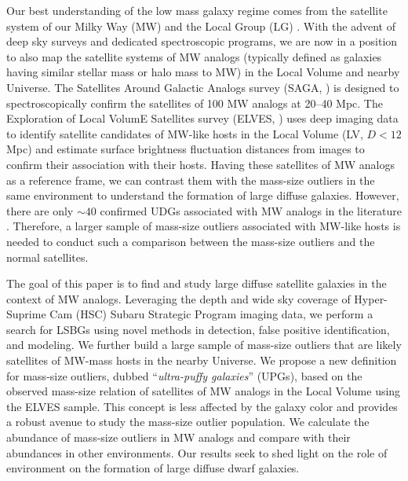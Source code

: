 \documentclass[twocolumn,astrosymb,twocolappendix,linenumbers]{aastex631}
\begin{document}
\begin{CJK*}{UTF8}{gbsn}
Our best understanding of the low mass galaxy regime comes from the satellite system of our Milky Way (MW) and the Local Group (LG) \citep[e.g.,][]{McConnachie2012,Simon2019}. With the advent of deep sky surveys and dedicated spectroscopic programs, we are now in a position to also map the satellite systems of MW analogs (typically defined as galaxies having similar stellar mass or halo mass to MW) in the Local Volume and nearby Universe. The Satellites Around Galactic Analogs survey (SAGA, \citealt{SAGA-I,SAGA-II}) is designed to spectroscopically confirm the satellites of 100 MW analogs at 20--40 Mpc. The Exploration of Local VolumE Satellites survey (ELVES, \citealt{ELVES-I,ELVES-II,CarlstenELVES2022}) uses deep imaging data to identify satellite candidates of MW-like hosts in the Local Volume (LV, $D<12$ Mpc) and estimate surface brightness fluctuation distances from images to confirm their association with their hosts. Having these satellites of MW analogs as a reference frame, we can contrast them with the mass-size outliers in the same environment to understand the formation of large diffuse galaxies. However, there are only $\sim 40$ confirmed UDGs associated with MW analogs in the literature \citep{Roman2017b,Cohen2018,SAGA-II,CarlstenELVES2022,Nashimoto2022,Karunakaran2022b}. Therefore, a larger sample of mass-size outliers associated with MW-like hosts is needed to conduct such a comparison between the mass-size outliers and the normal satellites.

The goal of this paper is to find and study large diffuse satellite galaxies in the context of MW analogs. Leveraging the depth and wide sky coverage of Hyper-Suprime Cam (HSC) Subaru Strategic Program imaging data, we perform a search for LSBGs using novel methods in detection, false positive identification, and modeling. We further build a large sample of mass-size outliers that are likely satellites of MW-mass hosts in the nearby Universe. We propose a new definition for mass-size outliers, dubbed ``\textit{ultra-puffy galaxies}'' (UPGs), based on the observed mass-size relation of satellites of MW analogs in the Local Volume using the ELVES sample. This concept is less affected by the galaxy color and provides a robust avenue to study the mass-size outlier population. 
We calculate the abundance of mass-size outliers in MW analogs and compare with their abundances in other environments. Our results seek to shed light on the role of environment on the formation of large diffuse dwarf galaxies. 



\end{CJK*}
\end{document}
